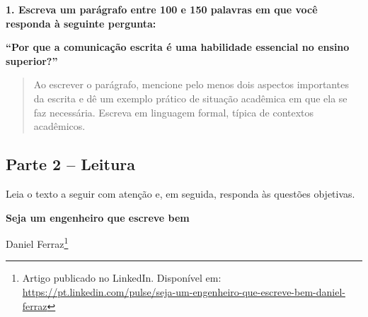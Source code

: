 \documentclass[
  12pt,
]{article}
\begin{document}
\textbf{1. Escreva um parágrafo entre 100 e 150 palavras em que você
responda à seguinte pergunta:}

\textbf{``Por que a comunicação escrita é uma habilidade essencial no
ensino superior?''}

\begin{quote}
\footnotesize
Ao escrever o parágrafo, mencione pelo menos dois aspectos importantes da escrita e dê um exemplo prático de situação acadêmica em que ela se faz necessária. Escreva em linguagem formal, típica de contextos acadêmicos.
\normalsize
\end{quote}

\noindent{}

\subsection{}\label{section}

\vspace{0.25cm}

\subsection{Parte 2 -- Leitura}\label{parte-2-leitura}

Leia o texto a seguir com atenção e, em seguida, responda às questões
objetivas. \vspace{0.25cm}

\Large\textbf{Seja um engenheiro que escreve bem}

\small Daniel Ferraz\footnote{Artigo publicado no LinkedIn. Disponível
  em:
  \url{https://pt.linkedin.com/pulse/seja-um-engenheiro-que-escreve-bem-daniel-ferraz}}
\end{document}
